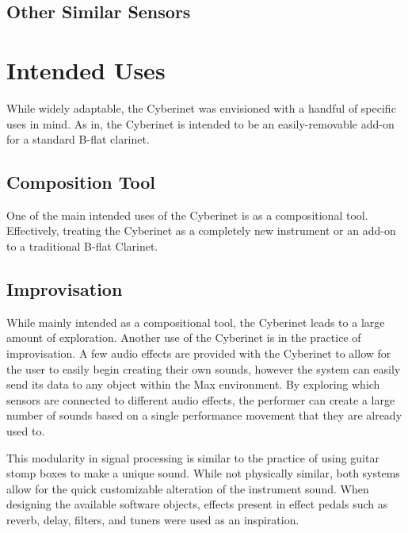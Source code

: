 \section{Other Similar Sensors}




\chapter{Intended Uses}

While widely adaptable, the Cyberinet was envisioned with a handful of specific uses in mind. As in, the Cyberinet is intended to be an easily-removable add-on for a standard B-flat clarinet.

\section{Composition Tool}
One of the main intended uses of the Cyberinet is as a compositional tool. Effectively, treating the Cyberinet as a completely new instrument or an add-on to a traditional B-flat Clarinet.

\section{Improvisation}

While mainly intended as a compositional tool, the Cyberinet leads to a large amount of exploration. Another use of the Cyberinet is in the practice of improvisation. A few audio effects are provided with the Cyberinet to allow for the user to easily begin creating their own sounds, however the system can easily send its data to any object within the Max environment. By exploring which sensors are connected to different audio effects, the performer can create a large number of sounds based on a single performance movement that they are already used to.

This modularity in signal processing is similar to the practice of using guitar stomp boxes to make a unique sound. While not physically similar, both systems allow for the quick customizable alteration of the instrument sound. When designing the available software objects, effects present in effect pedals such as reverb, delay, filters, and tuners were used as an inspiration.


